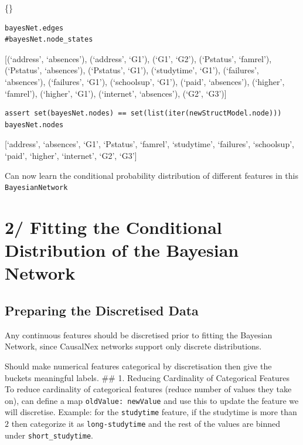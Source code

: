 \documentclass[
]{article}
\begin{document}
\{\}

\begin{verbatim}
bayesNet.edges
#bayesNet.node_states
\end{verbatim}

{[}(`address', `absences'), (`address', `G1'), (`G1', `G2'), (`Pstatus',
`famrel'), (`Pstatus', `absences'), (`Pstatus', `G1'), (`studytime',
`G1'), (`failures', `absences'), (`failures', `G1'), (`schoolsup',
`G1'), (`paid', `absences'), (`higher', `famrel'), (`higher', `G1'),
(`internet', `absences'), (`G2', `G3'){]}

\begin{verbatim}
assert set(bayesNet.nodes) == set(list(iter(newStructModel.node)))
bayesNet.nodes
\end{verbatim}

{[}`address', `absences', `G1', `Pstatus', `famrel', `studytime',
`failures', `schoolsup', `paid', `higher', `internet', `G2', `G3'{]}

Can now learn the conditional probability distribution of different
features in this \texttt{BayesianNetwork}

\hypertarget{fitting-the-conditional-distribution-of-the-bayesian-network}{%
\section{2/ Fitting the Conditional Distribution of the Bayesian
Network}\label{fitting-the-conditional-distribution-of-the-bayesian-network}}

\hypertarget{preparing-the-discretised-data}{%
\subsection{Preparing the Discretised
Data}\label{preparing-the-discretised-data}}

Any continuous features should be discretised prior to fitting the
Bayesian Network, since CausalNex networks support only discrete
distributions.

Should make numerical features categorical by discretisation then give
the buckets meaningful labels. \#\# 1. Reducing Cardinality of
Categorical Features To reduce cardinality of categorical features
(reduce number of values they take on), can define a map
\texttt{{oldValue: newValue}} and use this to update the
feature we will discretise. Example: for the
\texttt{studytime} feature, if the studytime is more than
\(2\) then categorize it as \texttt{long-studytime} and
the rest of the values are binned under
\texttt{short_studytime}.
\end{document}
